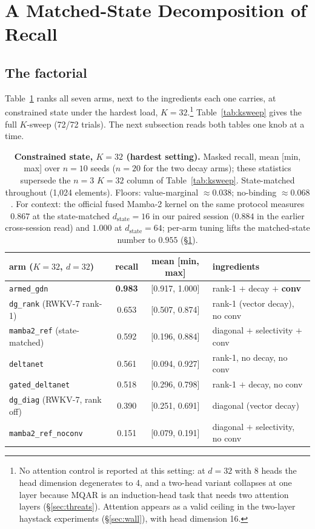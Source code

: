 \documentclass{article}
\newcommand{\dstate}{d_{\mathrm{state}}}
\newcommand{\armed}{\texttt{armed\_gdn}}
\newcommand{\gdn}{\texttt{gated\_deltanet}}
\newcommand{\dnet}{\texttt{deltanet}}
\newcommand{\dgrank}{\texttt{dg\_rank}}
\newcommand{\dgdiag}{\texttt{dg\_diag}}
\newcommand{\mambaref}{\texttt{mamba2\_ref}}
\newcommand{\mambanoconv}{\texttt{mamba2\_ref\_noconv}}
\begin{document}
\section{A Matched-State Decomposition of Recall}\label{sec:decomp}

\subsection{The factorial}\label{sec:factorial}

Table~\ref{tab:k32} ranks all seven arms, next to the ingredients each one carries, at constrained state under the hardest load, $K{=}32$.\footnote{No attention control is reported at this setting: at $d{=}32$ with 8 heads the head dimension degenerates to 4, and a two-head variant collapses at one layer because MQAR is an induction-head task that needs two attention layers (\S\ref{sec:threats}). Attention appears as a valid ceiling in the two-layer haystack experiments (\S\ref{sec:wall}), with head dimension 16.} Table~\ref{tab:ksweep} gives the full $K$-sweep (72/72 trials). The next subsection reads both tables one knob at a time.

\begin{table}[t]
\centering
\caption{\textbf{Constrained state, $K{=}32$ (hardest setting).} Masked recall, mean [min, max] over $n{=}10$ seeds ($n{=}20$ for the two decay arms); these statistics supersede the $n{=}3$ $K{=}32$ column of Table~\ref{tab:ksweep}. State-matched throughout (1{,}024 elements). Floors: value-marginal $\approx 0.038$; no-binding $\approx 0.068$. For context: the official fused Mamba-2 kernel on the same protocol measures $0.867$ at the state-matched $\dstate{=}16$ in our paired session ($0.884$ in the earlier cross-session read) and $1.000$ at $\dstate{=}64$; per-arm tuning lifts the matched-state number to $0.955$ (\S\ref{sec:decomp}).}
\label{tab:k32}
\vskip 0.1in
\small
\begin{tabular}{lccl}
\toprule
arm ($K{=}32$, $d{=}32$) & recall & mean [min, max] & ingredients \\
\midrule
\armed{} & \textbf{0.983} & [0.917, 1.000] & rank-1 $+$ decay $+$ \textbf{conv} \\
\dgrank{} (RWKV-7 rank-1) & 0.653 & [0.507, 0.874] & rank-1 (vector decay), no conv \\
\mambaref{} (state-matched) & 0.592 & [0.196, 0.884] & diagonal $+$ selectivity $+$ conv \\
\dnet{} & 0.561 & [0.094, 0.927] & rank-1, no decay, no conv \\
\gdn{} & 0.518 & [0.296, 0.798] & rank-1 $+$ decay, no conv \\
\dgdiag{} (RWKV-7, rank off) & 0.390 & [0.251, 0.691] & diagonal (vector decay) \\
\mambanoconv{} & 0.151 & [0.079, 0.191] & diagonal $+$ selectivity, no conv \\
\bottomrule
\end{tabular}
\end{table}
\end{document}
